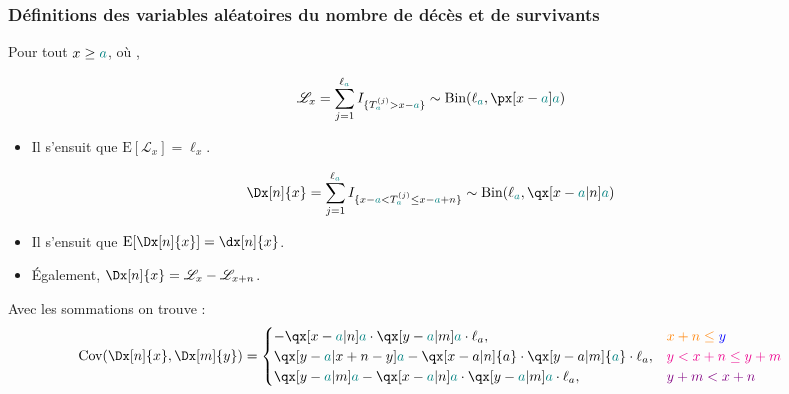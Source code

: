 \documentclass[10pt, french]{article}
\begin{document}
\begin{multicols*}{3}
\subsubsection*{Définitions des variables aléatoires du nombre de décès et de survivants}
Pour tout $x \ge\textcolor{teal}{a}$, où ,
\begin{definitionNOHFILL}
\begin{align*}
	\mathscr{L}_{x} 
	&=	\sum_{j = 1}^{\ell_{\textcolor{teal}{a}}} I_{\{T^{(j)}_{\textcolor{teal}{a}} > x - \textcolor{teal}{a}\}}
	\sim	\text{Bin}(\ell_{\textcolor{teal}{a}}, \px[x - \textcolor{teal}{a}]{\textcolor{teal}{a}})   
\end{align*}

\begin{itemize}
	\item	Il s'ensuit que $\text{E}[\mathscr{L}_{x}] = \ell_{x}$.
\end{itemize}                       
\end{definitionNOHFILL}

\begin{definitionNOHFILL}
\begin{align*}
	\Dx[n]{x} 
	&=	\sum_{j = 1}^{\ell_{\textcolor{teal}{a}}} I_{\{x - \textcolor{teal}{a} < T^{(j)}_{\textcolor{teal}{a}} \le x - \textcolor{teal}{a} + n\}}
	\sim	\text{Bin}(\ell_{\textcolor{teal}{a}}, \qx[x - \textcolor{teal}{a}| n]{\textcolor{teal}{a}})
\end{align*}

\begin{itemize}
	\item	Il s'ensuit que $\text{E}[\Dx[n]{x}] = \dx[n]{x}$.
	\item	Également, $\Dx[n]{x} = \mathscr{L}_{x} - \mathscr{L}_{x + n}$.
\end{itemize}
\end{definitionNOHFILL}

Avec les sommations on trouve :\\
\begin{align*}
	\text{Cov}(\Dx[n]{x}, \Dx[m]{y})
	&=	\begin{cases}
		-\qx[x - \textcolor{teal}{a} | n]{\textcolor{teal}{a}} \cdot \qx[y - \textcolor{teal}{a} | m]{\textcolor{teal}{a}} \cdot \ell_{a},	&	\color{orange}{x + n} \le\color{blue}{ y} \\
		\qx[y - \textcolor{teal}{a} | x + n - y]{\textcolor{teal}{a}} - \qx[x - a | n]{a} \cdot \qx[y - a | m]{\textcolor{teal}{a}} \cdot \ell_{a},	&	\color{magenta}{y < x + n \le y + m} \\
		\qx[y - \textcolor{teal}{a} | m]{\textcolor{teal}{a}} - \qx[x - \textcolor{teal}{a} | n]{\textcolor{teal}{a}} \cdot \qx[y - \textcolor{teal}{a} | m]{\textcolor{teal}{a}} \cdot \ell_{a},	&	\color{violet}{y + m < x + n} 
	\end{cases}	
\end{align*}


\end{multicols*}
\end{document}
